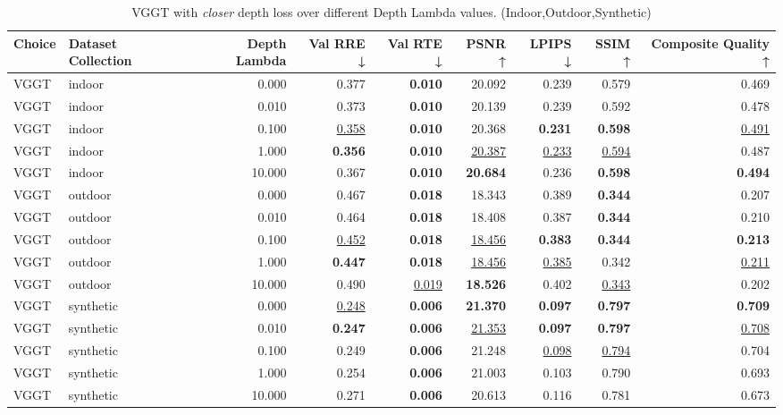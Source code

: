 \begin{table}[H]
\caption{\ifdefined\customcaption \customcaption \else VGGT with \textit{closer} depth loss over different Depth Lambda values. (Indoor,Outdoor,Synthetic) \fi}
\label{tab:05_depth_lambda_indoor,outdoor,synthetic}
\centering
\scriptsize
\begin{tabular}{llrrrrrrr}
\toprule
Choice & Dataset Collection & Depth Lambda & Val RRE ↓ & Val RTE ↓ & PSNR ↑ & LPIPS ↓ & SSIM ↑ & Composite Quality ↑ \\
\midrule
VGGT & indoor & 0.000 & 0.377 & \textbf{0.010} & 20.092 & 0.239 & 0.579 & 0.469 \\
VGGT & indoor & 0.010 & 0.373 & \textbf{0.010} & 20.139 & 0.239 & 0.592 & 0.478 \\
VGGT & indoor & 0.100 & \underline{0.358} & \textbf{0.010} & 20.368 & \textbf{0.231} & \textbf{0.598} & \underline{0.491} \\
VGGT & indoor & 1.000 & \textbf{0.356} & \textbf{0.010} & \underline{20.387} & \underline{0.233} & \underline{0.594} & 0.487 \\
VGGT & indoor & 10.000 & 0.367 & \textbf{0.010} & \textbf{20.684} & 0.236 & \textbf{0.598} & \textbf{0.494} \\
\midrule
VGGT & outdoor & 0.000 & 0.467 & \textbf{0.018} & 18.343 & 0.389 & \textbf{0.344} & 0.207 \\
VGGT & outdoor & 0.010 & 0.464 & \textbf{0.018} & 18.408 & 0.387 & \textbf{0.344} & 0.210 \\
VGGT & outdoor & 0.100 & \underline{0.452} & \textbf{0.018} & \underline{18.456} & \textbf{0.383} & \textbf{0.344} & \textbf{0.213} \\
VGGT & outdoor & 1.000 & \textbf{0.447} & \textbf{0.018} & \underline{18.456} & \underline{0.385} & 0.342 & \underline{0.211} \\
VGGT & outdoor & 10.000 & 0.490 & \underline{0.019} & \textbf{18.526} & 0.402 & \underline{0.343} & 0.202 \\
\midrule
VGGT & synthetic & 0.000 & \underline{0.248} & \textbf{0.006} & \textbf{21.370} & \textbf{0.097} & \textbf{0.797} & \textbf{0.709} \\
VGGT & synthetic & 0.010 & \textbf{0.247} & \textbf{0.006} & \underline{21.353} & \textbf{0.097} & \textbf{0.797} & \underline{0.708} \\
VGGT & synthetic & 0.100 & 0.249 & \textbf{0.006} & 21.248 & \underline{0.098} & \underline{0.794} & 0.704 \\
VGGT & synthetic & 1.000 & 0.254 & \textbf{0.006} & 21.003 & 0.103 & 0.790 & 0.693 \\
VGGT & synthetic & 10.000 & 0.271 & \textbf{0.006} & 20.613 & 0.116 & 0.781 & 0.673 \\
\bottomrule
\end{tabular}
\end{table}